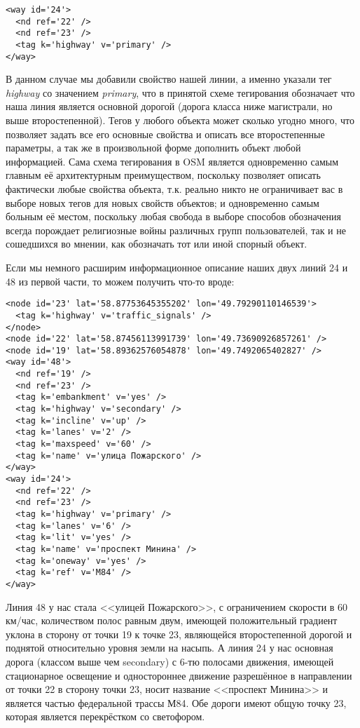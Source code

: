 \small
\begin{verbatim}
<way id='24'>
  <nd ref='22' />
  <nd ref='23' />
  <tag k='highway' v='primary' />
</way>
\end{verbatim}
\normalsize

В данном случае мы добавили свойство нашей линии, а именно указали тег 
\emph{highway} со значением \emph{primary}, что в принятой схеме тегирования 
обозначает что наша линия является основной дорогой (дорога класса ниже 
магистрали, но выше второстепенной). Тегов у любого объекта может сколько 
угодно много, что позволяет задать все его основные свойства и описать все 
второстепенные параметры, а так же в произвольной форме дополнить объект любой 
информацией. Сама схема тегирования в OSM является одновременно самым главным 
её архитектурным преимуществом, поскольку позволяет описать фактически любые 
свойства объекта, т.к. реально никто не ограничивает вас в выборе новых тегов 
для новых свойств объектов; и одновременно самым больным её местом, поскольку 
любая свобода в выборе способов обозначения всегда порождает религиозные войны 
различных групп пользователей, так и не сошедшихся во мнении, как обозначать 
тот или иной спорный объект.

Если мы немного расширим информационное описание наших двух линий 24 и 48 из 
первой части, то можем получить что-то вроде:

\small
\begin{verbatim}
<node id='23' lat='58.87753645355202' lon='49.79290110146539'>
  <tag k='highway' v='traffic_signals' />
</node>
<node id='22' lat='58.87456113991739' lon='49.73690926857261' />
<node id='19' lat='58.89362576054878' lon='49.7492065402827' />
<way id='48'>
  <nd ref='19' />
  <nd ref='23' />
  <tag k='embankment' v='yes' />
  <tag k='highway' v='secondary' />
  <tag k='incline' v='up' />
  <tag k='lanes' v='2' />
  <tag k='maxspeed' v='60' />
  <tag k='name' v='улица Пожарского' />
</way>
<way id='24'>
  <nd ref='22' />
  <nd ref='23' />
  <tag k='highway' v='primary' />
  <tag k='lanes' v='6' />
  <tag k='lit' v='yes' />
  <tag k='name' v='проспект Минина' />
  <tag k='oneway' v='yes' />
  <tag k='ref' v='М84' />
</way>
\end{verbatim}
\normalsize

Линия 48 у нас стала <<улицей Пожарского>>, с ограничением скорости в 
60 км/час, количеством полос равным двум, имеющей положительный градиент 
уклона в сторону от точки 19 к точке 23, являющейся второстепенной дорогой и 
поднятой относительно уровня земли на насыпь. А линия 24 у нас основная дорога 
(классом выше чем secondary) с 6-тю полосами движения, имеющей стационарное 
освещение и одностороннее движение разрешённое в направлении от точки 22 в 
сторону точки 23, носит название <<проспект Минина>> и является частью 
федеральной трассы М84. Обе дороги имеют общую точку 23, которая является 
перекрёстком со светофором. \cite{habrahabr02}

